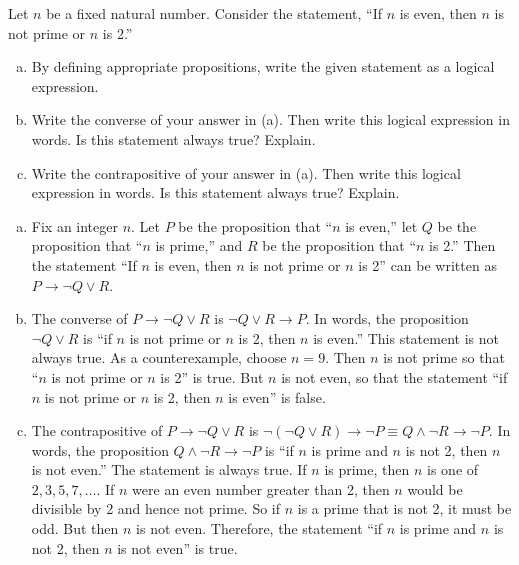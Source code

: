 \documentclass[11pt,letterpaper]{article}
\begin{document}
\newpage



 Let $n$ be a fixed natural number. Consider the statement, ``If $n$ is even, then $n$ is not prime or $n$ is 2.''
	\begin{enumerate}[(a)]
	\item By defining appropriate propositions, write the given statement as a logical expression.
	\item Write the converse of your answer in (a). Then write this logical expression in words. Is this statement always true? Explain.
	\item Write the contrapositive of your answer in (a). Then write this logical expression in words. Is this statement always true? Explain. 
	\end{enumerate} \pspace

\sol
\begin{enumerate}[(a)]
\item Fix an integer $n$. Let $P$ be the proposition that ``$n$ is even,'' let $Q$ be the proposition that ``$n$ is prime,'' and $R$ be the proposition that ``$n$ is 2.'' Then the statement ``If $n$ is even, then $n$ is not prime or $n$ is 2'' can be written as $P \to \neg Q \vee R$. \pspace

\item The converse of $P \to \neg Q \vee R$ is $\neg Q \vee R \to P$. In words, the proposition $\neg Q \vee R$ is ``if $n$ is not prime or $n$ is 2, then $n$ is even.'' This statement is not always true. As a counterexample, choose $n= 9$. Then $n$ is not prime so that ``$n$ is not prime or $n$ is 2'' is true. But $n$ is not even, so that the statement ``if $n$ is not prime or $n$ is 2, then $n$ is even'' is false. \pspace

\item The contrapositive of $P \to \neg Q \vee R$ is $\neg (\neg Q \vee R) \to \neg P \equiv Q \wedge \neg R \to \neg P$. In words, the proposition $Q \wedge \neg R \to \neg P$ is ``if $n$ is prime and $n$ is not 2, then $n$ is not even.'' The statement is always true. If $n$ is prime, then $n$ is one of $2, 3, 5, 7, \ldots$. If $n$ were an even number greater than 2, then $n$ would be divisible by 2 and hence not prime. So if $n$ is a prime that is not 2, it must be odd. But then $n$ is not even. Therefore, the statement ``if $n$ is prime and $n$ is not 2, then $n$ is not even'' is true. 
\end{enumerate}
\end{document}

